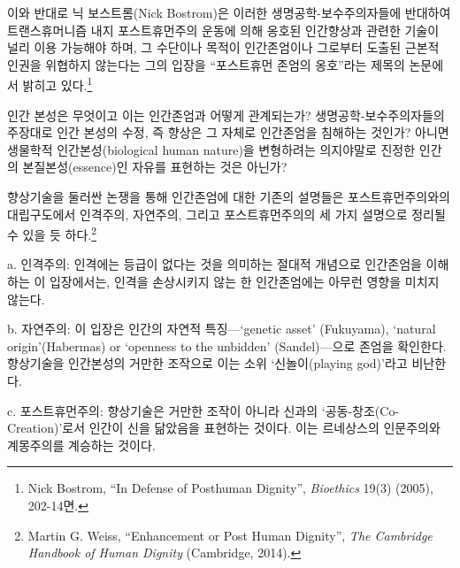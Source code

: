 이와 반대로 닉 보스트롬(Nick Bostrom)은 이러한 생명공학-보수주의자들에 반대하여 트랜스휴머니즘 내지 포스트휴먼주의 운동에 의해 옹호된 인간향상과 관련한 기술이 널리 이용 가능해야 하며, 그 수단이나 목적이 인간존엄이나 그로부터 도출된 근본적 인권을 위협하지 않는다는 그의 입장을 ``포스트휴먼 존엄의 옹호''라는 제목의 논문에서 밝히고 있다.\footnote{Nick Bostrom, ``In Defense of Posthuman Dignity'', \emph{Bioethics} 19(3) (2005), 202-14면.}

인간 본성은 무엇이고 이는 인간존엄과 어떻게 관계되는가? 생명공학-보수주의자들의 주장대로 인간 본성의 수정, 즉 향상은 그 자체로 인간존엄을 침해하는 것인가? 아니면 생물학적 인간본성(biological human nature)을 변형하려는 의지야말로 진정한 인간의 본질본성(essence)인 자유를 표현하는 것은 아닌가?

향상기술을 둘러싼 논쟁을 통해 인간존엄에 대한 기존의 설명들은 포스트휴먼주의와의 대립구도에서 인격주의, 자연주의, 그리고 포스트휴먼주의의 세 가지 설명으로 정리될 수 있을 듯 하다.\footnote{Martin G. Weiss, ``Enhancement or Post Human Dignity'', \emph{The Cambridge Handbook of Human Dignity} (Cambridge, 2014).}

a. 인격주의: 인격에는 등급이 없다는 것을 의미하는 절대적 개념으로 인간존엄을 이해하는 이 입장에서는, 인격을 손상시키지 않는 한 인간존엄에는 아무런 영향을 미치지 않는다.

b. 자연주의: 이 입장은 인간의 자연적 특징---`genetic asset' (Fukuyama), `natural origin'(Habermas) or `openness to the unbidden' (Sandel)---으로 존엄을 확인한다. 향상기술을 인간본성의 거만한 조작으로 이는 소위 `신놀이(playing god)'라고 비난한다.

c. 포스트휴먼주의: 향상기술은 거만한 조작이 아니라 신과의 `공동-창조(Co-Creation)'로서 인간이 신을 닮았음을 표현하는 것이다. 이는 르네상스의 인문주의와 계몽주의를 계승하는 것이다.

